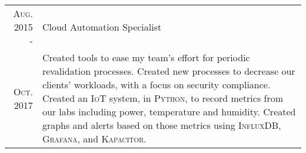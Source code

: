 \documentclass[letterpaper,10pt]{article}
\begin{document}
\begin{tabular}{R|p{6.2in}}
	\textsc{Aug.} 2015 -           & Cloud Automation Specialist                                                                                                                                                                                                                                                                                                                                                                                                                                                                                                                                                                                                                                                                                                                                                                                                                                                                                                                                                                                                                                                                                                                                                                                                                       \\
	\textsc{Oct.} 2017\phantom{ -} & \footnotesize Created tools to ease my team's effort for periodic revalidation processes. Created new processes to decrease our clients' workloads, with a focus on security compliance. Created an \textsc{IoT} system, in \textsc{Python}, to record metrics from our labs including power, temperature and humidity. Created graphs and alerts based on those metrics using \textsc{InfluxDB}, \textsc{Grafana}, and \textsc{Kapacitor}.                                                                                                                                                                                                                                                                                                                                                                                                                                                                                                                                                                                                                                                                                                                                                                                                       \\

\end{tabular}
\end{document}

